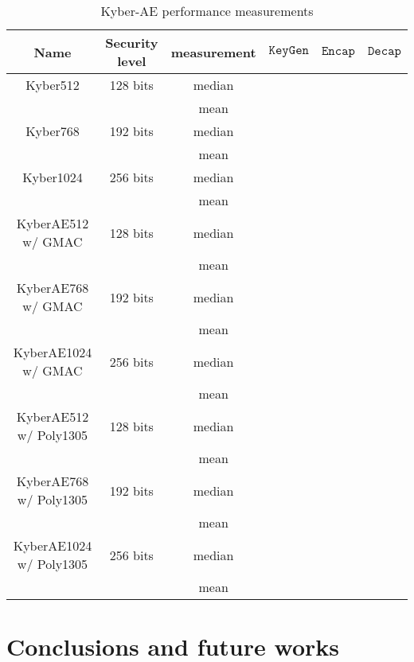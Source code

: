 \documentclass[floatrow,journal=tches,submission]{iacrtrans}
\newcommand{\keygen}{\texttt{KeyGen}}
\newcommand{\encap}{\texttt{Encap}}
\newcommand{\decap}{\texttt{Decap}}
\begin{document}
\begin{table}[H]
    \centering
    \begin{tabular}{|c|c|c|c|c|c|}
        \hline
        Name & Security level & measurement & $\keygen$ & $\encap$ & $\decap$ \\
        \hline
        Kyber512 & 128 bits & median &  & &  \\
        & & mean &  & &  \\
        \hline
        Kyber768 & 192 bits & median &  & &  \\
        & & mean &  & &  \\
        \hline
        Kyber1024 & 256 bits & median &  & &  \\
        & & mean &  & &  \\
        \hline
        KyberAE512 w/ GMAC& 128 bits & median &  & &  \\
        & & mean &  & &  \\
        \hline
        KyberAE768 w/ GMAC& 192 bits & median &  & &  \\
        & & mean &  & &  \\
        \hline
        KyberAE1024 w/ GMAC& 256 bits & median &  & &  \\
        & & mean &  & &  \\
        \hline
        KyberAE512 w/ Poly1305& 128 bits & median &  & &  \\
        & & mean &  & &  \\
        \hline
        KyberAE768 w/ Poly1305& 192 bits & median &  & &  \\
        & & mean &  & &  \\
        \hline
        KyberAE1024 w/ Poly1305& 256 bits & median &  & &  \\
        & & mean &  & &  \\
        \hline
    \end{tabular}
    \caption{Kyber-AE performance measurements}\label{tbl:kyber-ae-perf}
\end{table}

\section{Conclusions and future works}\label{sec:future-works}



\end{document}
